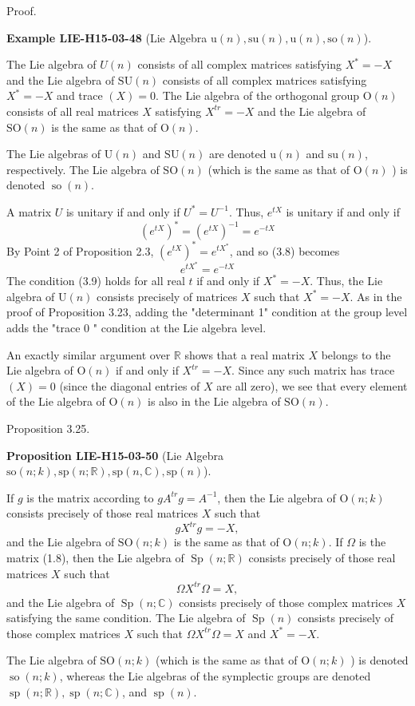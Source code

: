 \documentclass[10pt, letterpaper]{article}
\newcommand{\R}{\mathbb{R}}
\newcommand{\C}{\mathbb{C}}
\newcommand{\CustomHeading}[3]{%
  \par\medskip\noindent%
  \textbf{#1 #2} \textnormal{(#3)}.\enskip%
}
\newenvironment{PROP}[2]{\begin{unitbox}\CustomHeading{Proposition}{#1}{#2}}{\end{unitbox}}
\newenvironment{EXA}[2]{\begin{unitbox}\CustomHeading{Example}{#1}{#2}}{\end{unitbox}}
\begin{document}
Proof. 


\begin{EXA}{LIE-H15-03-48}{Lie Algebra $\mathrm{u}(n),\mathrm{su}(n),\mathrm{u}(n),\mathrm{so}(n)$}
The Lie algebra of $U(n)$ consists of all complex matrices satisfying $X^{*}=-X$ and the Lie algebra of $\mathrm{SU}(n)$ consists of all complex matrices satisfying $X^{*}=-X$ and trace $(X)=0$. The Lie algebra of the orthogonal group $\mathrm{O}(n)$ consists of all real matrices $X$ satisfying $X^{t r}=-X$ and the Lie algebra of $\mathrm{SO}(n)$ is the same as that of $\mathrm{O}(n)$.

The Lie algebras of $\mathrm{U}(n)$ and $\mathrm{SU}(n)$ are denoted $\mathrm{u}(n)$ and $\mathrm{su}(n)$, respectively. The Lie algebra of $\mathrm{SO}(n)$ (which is the same as that of $\mathrm{O}(n)$ ) is denoted $\operatorname{so}(n)$.

A matrix $U$ is unitary if and only if $U^{*}=U^{-1}$. Thus, $e^{t X}$ is unitary if and only if
$$
\left(e^{t X}\right)^{*}=\left(e^{t X}\right)^{-1}=e^{-t X}
$$
By Point 2 of Proposition 2.3, $\left(e^{t X}\right)^{*}=e^{t X^{*}}$, and so (3.8) becomes
$$
e^{t X^{*}}=e^{-t X}
$$
The condition (3.9) holds for all real $t$ if and only if $X^{*}=-X$. Thus, the Lie algebra of $\mathrm{U}(n)$ consists precisely of matrices $X$ such that $X^{*}=-X$. As in the proof of Proposition 3.23, adding the "determinant 1" condition at the group level adds the "trace 0 " condition at the Lie algebra level.

An exactly similar argument over $\mathbb{R}$ shows that a real matrix $X$ belongs to the Lie algebra of $\mathrm{O}(n)$ if and only if $X^{t r}=-X$. Since any such matrix has trace $(X)=0$ (since the diagonal entries of $X$ are all zero), we see that every element of the Lie algebra of $\mathrm{O}(n)$ is also in the Lie algebra of $\mathrm{SO}(n)$.
\end{EXA}




Proposition 3.25. 


\begin{PROP}{LIE-H15-03-50}{Lie Algebra $\mathrm{so}(n;k),\mathrm{sp}(n;\R),\mathrm{sp}(n,\C),\mathrm{sp}(n)$}
If $g$ is the matrix according to $g A^{t r} g=A^{-1}$, then the Lie algebra of $\mathrm{O}(n ; k)$ consists precisely of those real matrices $X$ such that
$$
g X^{t r} g=-X,
$$
and the Lie algebra of $\mathrm{SO}(n ; k)$ is the same as that of $\mathrm{O}(n ; k)$. If $\Omega$ is the matrix (1.8), then the Lie algebra of $\operatorname{Sp}(n ; \mathbb{R})$ consists precisely of those real matrices $X$ such that
$$
\Omega X^{t r} \Omega=X,
$$
and the Lie algebra of $\operatorname{Sp}(n ; \mathbb{C})$ consists precisely of those complex matrices $X$ satisfying the same condition. The Lie algebra of $\operatorname{Sp}(n)$ consists precisely of those complex matrices $X$ such that $\Omega X^{t r} \Omega=X$ and $X^{*}=-X$.

The Lie algebra of $\mathrm{SO}(n ; k)$ (which is the same as that of $\mathrm{O}(n ; k)$ ) is denoted $\operatorname{so}(n ; k)$, whereas the Lie algebras of the symplectic groups are denoted $\operatorname{sp}(n ; \mathbb{R}), \operatorname{sp}(n ; \mathbb{C})$, and $\operatorname{sp}(n)$.
\end{PROP}
\end{document}
